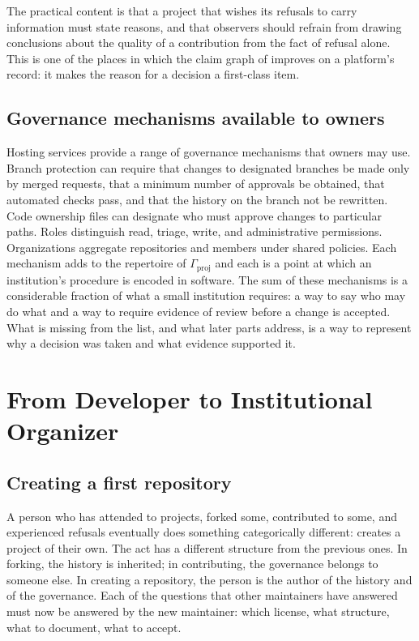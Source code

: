 \documentclass[11pt,twoside,openright]{book}
\theoremstyle{plain}
\theoremstyle{definition}
\theoremstyle{remark}
\begin{document}
The practical content is that a project that wishes its refusals to carry information must state reasons, and that observers should refrain from drawing conclusions about the quality of a contribution from the fact of refusal alone. This is one of the places in which the claim graph of  improves on a platform's record: it makes the reason for a decision a first-class item.

\section{Governance mechanisms available to owners}

Hosting services provide a range of governance mechanisms that owners may use. Branch protection can require that changes to designated branches be made only by merged requests, that a minimum number of approvals be obtained, that automated checks pass, and that the history on the branch not be rewritten. Code ownership files can designate who must approve changes to particular paths. Roles distinguish read, triage, write, and administrative permissions. Organizations aggregate repositories and members under shared policies. Each mechanism adds to the repertoire of $\Gamma_{\mathrm{proj}}$ and each is a point at which an institution's procedure is encoded in software. The sum of these mechanisms is a considerable fraction of what a small institution requires: a way to say who may do what and a way to require evidence of review before a change is accepted. What is missing from the list, and what later parts address, is a way to represent why a decision was taken and what evidence supported it.

\chapter{From Developer to Institutional Organizer}\label{ch:organizer}

\section{Creating a first repository}

A person who has attended to projects, forked some, contributed to some, and experienced refusals eventually does something categorically different: creates a project of their own. The act has a different structure from the previous ones. In forking, the history is inherited; in contributing, the governance belongs to someone else. In creating a repository, the person is the author of the history and of the governance. Each of the questions that other maintainers have answered must now be answered by the new maintainer: which license, what structure, what to document, what to accept.
\end{document}
